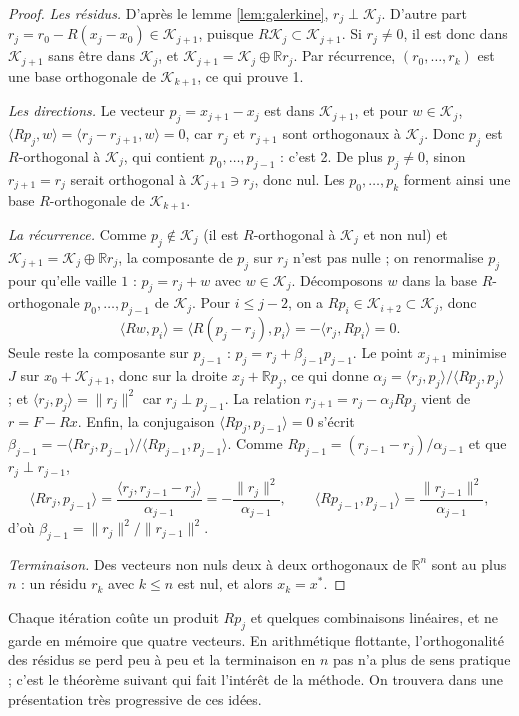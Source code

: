 \documentclass[11pt,a4paper]{article}
\theoremstyle{plain}
\theoremstyle{definition}
\theoremstyle{remark}
\newcommand{\R}{\mathbb{R}}
\newcommand{\K}{\mathcal{K}}
\newcommand{\ps}[2]{\langle #1,#2\rangle}
\begin{document}
\begin{proof}
\emph{Les résidus.} D'après le lemme \ref{lem:galerkine}, $r_j\perp\K_j$. D'autre part $r_j=r_0-R(x_j-x_0)\in\K_{j+1}$, puisque $R\K_j\subset\K_{j+1}$. Si $r_j\neq0$, il est donc dans $\K_{j+1}$ sans être dans $\K_j$, et $\K_{j+1}=\K_j\oplus\R r_j$. Par récurrence, $(r_0,\dots,r_k)$ est une base orthogonale de $\K_{k+1}$, ce qui prouve 1.

\emph{Les directions.} Le vecteur $p_j=x_{j+1}-x_j$ est dans $\K_{j+1}$, et pour $w\in\K_j$, $\ps{Rp_j}{w}=\ps{r_j-r_{j+1}}{w}=0$, car $r_j$ et $r_{j+1}$ sont orthogonaux à $\K_j$. Donc $p_j$ est $R$-orthogonal à $\K_j$, qui contient $p_0,\dots,p_{j-1}$ : c'est 2. De plus $p_j\neq0$, sinon $r_{j+1}=r_j$ serait orthogonal à $\K_{j+1}\ni r_j$, donc nul. Les $p_0,\dots,p_k$ forment ainsi une base $R$-orthogonale de $\K_{k+1}$.

\emph{La récurrence.} Comme $p_j\notin\K_j$ (il est $R$-orthogonal à $\K_j$ et non nul) et $\K_{j+1}=\K_j\oplus\R r_j$, la composante de $p_j$ sur $r_j$ n'est pas nulle ; on renormalise $p_j$ pour qu'elle vaille $1$ : $p_j=r_j+w$ avec $w\in\K_j$. Décomposons $w$ dans la base $R$-orthogonale $p_0,\dots,p_{j-1}$ de $\K_j$. Pour $i\leq j-2$, on a $Rp_i\in\K_{i+2}\subset\K_j$, donc
\[
  \ps{Rw}{p_i}=\ps{R(p_j-r_j)}{p_i}=-\ps{r_j}{Rp_i}=0 .
\]
Seule reste la composante sur $p_{j-1}$ : $p_j=r_j+\beta_{j-1}p_{j-1}$. Le point $x_{j+1}$ minimise $J$ sur $x_0+\K_{j+1}$, donc sur la droite $x_j+\R p_j$, ce qui donne $\alpha_j=\ps{r_j}{p_j}/\ps{Rp_j}{p_j}$ ; et $\ps{r_j}{p_j}=\|r_j\|^2$ car $r_j\perp p_{j-1}$. La relation $r_{j+1}=r_j-\alpha_jRp_j$ vient de $r=F-Rx$. Enfin, la conjugaison $\ps{Rp_j}{p_{j-1}}=0$ s'écrit $\beta_{j-1}=-\ps{Rr_j}{p_{j-1}}/\ps{Rp_{j-1}}{p_{j-1}}$. Comme $Rp_{j-1}=(r_{j-1}-r_j)/\alpha_{j-1}$ et que $r_j\perp r_{j-1}$,
\[
  \ps{Rr_j}{p_{j-1}}=\frac{\ps{r_j}{r_{j-1}-r_j}}{\alpha_{j-1}}=-\frac{\|r_j\|^2}{\alpha_{j-1}},\qquad
  \ps{Rp_{j-1}}{p_{j-1}}=\frac{\|r_{j-1}\|^2}{\alpha_{j-1}},
\]
d'où $\beta_{j-1}=\|r_j\|^2/\|r_{j-1}\|^2$.

\emph{Terminaison.} Des vecteurs non nuls deux à deux orthogonaux de $\R^n$ sont au plus $n$ : un résidu $r_k$ avec $k\leq n$ est nul, et alors $x_k=x^*$.
\end{proof}

Chaque itération coûte un produit $Rp_j$ et quelques combinaisons linéaires, et ne garde en mémoire que quatre vecteurs. En arithmétique flottante, l'orthogonalité des résidus se perd peu à peu et la terminaison en $n$ pas n'a plus de sens pratique ; c'est le théorème suivant qui fait l'intérêt de la méthode. On trouvera dans \cite{shewchuk} une présentation très progressive de ces idées.
\end{document}
